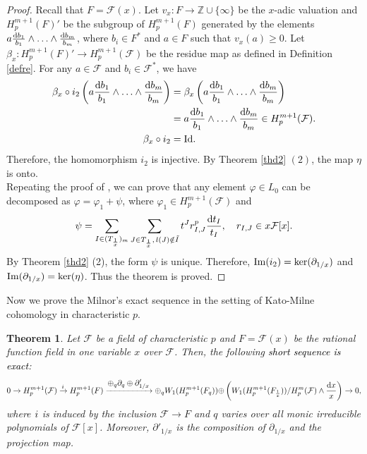 \documentclass[times,10pt]{amsart}
\newcommand{\Z}{\ensuremath{\mathbb{Z}}}
\newcommand{\dd}{{\rm d}}
\newcommand{\F}{\ensuremath{\mathcal{F}}}
\newcommand{\n}{\ensuremath{\infty}}
\renewcommand{\phi}{\varphi}
\newtheorem{thm}{Theorem}[section]
\begin{document}
\begin{proof}
      Recall that $F=\F(x)$.  Let  $v_x:F\xrightarrow{}\Z\cup\{\n\}$ be the $x$-adic valuation and  $ H_p^{m+1}(F)'$  be the subgroup of $ H_p^{m+1}(F)$ generated by the elements $ a \frac{\dd b_1}{ b_1}\wedge \ldots\wedge \frac{\dd b_m}{b_m}$, where $ b_i\in F^*$ and $a\in F$ such that $v_x(a)\geq 0$.     Let $\beta_x: H_p^{m+1}( F)'\xrightarrow{}   H_p^{ m+1}({\F})$ be the  residue map as defined in Definition \ref{defre}.  For any $a\in \F$ and $b_i\in \F^*$, we have \begin{align*}
           \beta_x\circ i_2\left( a\frac{\dd b_1}{b_1}\wedge \ldots\wedge \frac{\dd b_m}{b_m}\right)&=  \beta_x\left(  a\frac{\dd b_1}{b_1}\wedge \ldots\wedge \frac{\dd b_m}{b_m}\right)\\& =   a\frac{\dd b_1}{b_1}\wedge \ldots\wedge \frac{\dd b_m}{b_m}\in H_p^{m+1}(\F).\\ \beta_x\circ i_2&= \rm{Id}.
      \end{align*} Therefore,  the  homomorphism $i_2$ is injective.  By Theorem \ref{thd2} $(2)$, the map $\eta$ is onto.  \\
       Repeating  the proof of  \cite[Theorem 4.16]{ex}, we  can prove that any element $\phi\in L_0$ can be decomposed as $\phi= \phi_1+ \psi$, where $\phi_1\in H_p^{m+1}(\F)$ and $$\psi = \sum_{ I\in ( T_{\frac{1}{x}})_m}\sum_{J\in T_{\frac{1}{x}},\, l(J)\notin \tilde{I}} t^J r^p_{I,J} \frac{\dd t_I}{t_I},\quad r_{I,J}\in x\F[x].$$   By Theorem \ref{thd2} (2), the form $\psi$ is unique. Therefore, $ {\rm Im}(i_2)= \ker(\partial_{1/x}) $ and $ {\rm Im}(\partial_{1/x})= \ker(\eta)$.  Thus the theorem is proved.
\end{proof}
Now we prove the Milnor's exact sequence in the {setting}  of Kato-Milne cohomology in characteristic $p$.
\begin{thm}\label{rst}Let $\mathcal{F}$ be a field of characteristic $p$ and $F=\mathcal{F}(x)$ be the rational function field {in one variable $x$ over $\F$}. Then, the following \textcolor{black}{short sequence is   exact}:\[ 0\xrightarrow{} H_p^{m+1}(\mathcal{F})\xrightarrow{\textcolor{black}{i}}  H_p^{m+1}(F)\xrightarrow{\displaystyle{\oplus_{q}\partial_q\oplus\partial'_{{1}/{x}}}}\displaystyle{ \oplus_{q}W_1(H_p^{m+1}(F_q))\oplus} \left({ W_1(H_p^{m+1}( F_{\frac{1}{x}}))}/{ H_p^m(\mathcal{F})\wedge { \frac{\mathrm{d}x}{x}}}\right)\xrightarrow{}0,\] where $\textcolor{black}{i}$ is induced by 
 the inclusion $ \mathcal{F}\xrightarrow{}F$ and $q$ varies  over  all monic irreducible polynomials  of $ \mathcal{F}[x]$. Moreover, $\partial'_{{1}/{x}}$ is the composition of $\partial_{{1}/{x}}$ and the projection map. 
  \end{thm}
\end{document}
